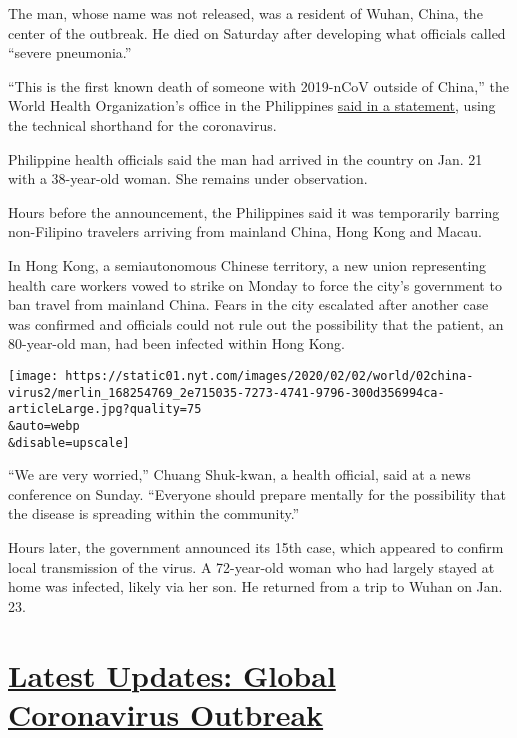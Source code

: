 The man, whose name was not released, was a resident of Wuhan, China,
the center of the outbreak. He died on Saturday after developing what
officials called ``severe pneumonia.''

``This is the first known death of someone with 2019-nCoV outside of
China,'' the World Health Organization's office in the Philippines
\href{https://www.facebook.com/whophilippines/photos/a.514585071988103/2664930260286896/?type=3\&__xts__\%5B0\%5D=68.ARANVVlwrEFTML5lekIxBZNMqIbfrFgdiCrfveU-KkAfadCSrp4IBIqFDS02YQzuLERpt-CdtaoSjeg71-s8JN5syTzk8bnheLsSOOS0h5V3GR86fa3688BBhxMwuyaGe-IwatUH1sYDoUo-4BALQjKnvQDnewFAioKiQ3megPQRw7f-BcCbW1mChINqsYlEaUjMlMQYIVsHmdoCh-zZhGr5JfIXqmffJTWMtS66jfl-CoSoVu_pfaoBxBhAUenU1TCHQ5RXl6eqHI67HS_tT0S_DaW-TuMaO8ds0RKn7FBHgqn4EqkbQxJ_v0a-15TntvvUQV1UFa692Oqpkesg75PWmQ\&__tn__=-R}{said
in a statement}, using the technical shorthand for the coronavirus.

Philippine health officials said the man had arrived in the country on
Jan. 21 with a 38-year-old woman. She remains under observation.

Hours before the announcement, the Philippines said it was temporarily
barring non-Filipino travelers arriving from mainland China, Hong Kong
and Macau.

In Hong Kong, a semiautonomous Chinese territory, a new union
representing health care workers vowed to strike on Monday to force the
city's government to ban travel from mainland China. Fears in the city
escalated after another case was confirmed and officials could not rule
out the possibility that the patient, an 80-year-old man, had been
infected within Hong Kong.

\texttt{[image: https://static01.nyt.com/images/2020/02/02/world/02china-virus2/merlin\_168254769\_2e715035-7273-4741-9796-300d356994ca-articleLarge.jpg?quality=75\\\&auto=webp\\\&disable=upscale]}

``We are very worried,'' Chuang Shuk-kwan, a health official, said at a
news conference on Sunday. ``Everyone should prepare mentally for the
possibility that the disease is spreading within the community.''

Hours later, the government announced its 15th case, which appeared to
confirm local transmission of the virus. A 72-year-old woman who had
largely stayed at home was infected, likely via her son. He returned
from a trip to Wuhan on Jan. 23.

\hypertarget{latest-updates-global-coronavirus-outbreak}{%
\section{\texorpdfstring{\href{https://www.nytimes.com/2020/08/04/world/coronavirus-covid-19.html?action=click\&pgtype=Article\&state=default\&region=MAIN_CONTENT_1\&context=storylines_live_updates}{Latest
Updates: Global Coronavirus
Outbreak}}{Latest Updates: Global Coronavirus Outbreak}}\label{latest-updates-global-coronavirus-outbreak}}


